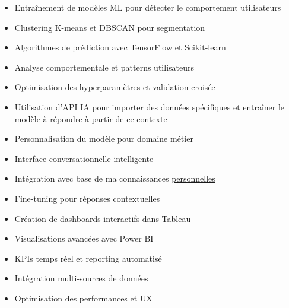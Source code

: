 \documentclass[10pt,a4paper,normalphoto]{altacv}
\begin{document}
\clearpage


\begin{itemize}
\item Entraînement de modèles ML pour détecter le comportement utilisateurs
\item Clustering K-means et DBSCAN pour segmentation
\item Algorithmes de prédiction avec TensorFlow et Scikit-learn
\item Analyse comportementale et patterns utilisateurs
\item Optimisation des hyperparamètres et validation croisée
\end{itemize}

\divider

\begin{itemize}
\item Utilisation d'API IA pour importer des données spécifiques et entraîner le modèle à répondre à partir de ce contexte
\item Personnalisation du modèle pour domaine métier
\item Interface conversationnelle intelligente
\item Intégration avec base de ma connaissances \href{https://anas.itssghir.com}{\color{DataGreen}\uline{personnelles}}
\item Fine-tuning pour réponses contextuelles
\end{itemize}

\divider

\begin{itemize}
\item Création de dashboards interactifs dans Tableau
\item Visualisations avancées avec Power BI
\item KPIs temps réel et reporting automatisé
\item Intégration multi-sources de données
\item Optimisation des performances et UX
\end{itemize}

\divider
\end{document}
